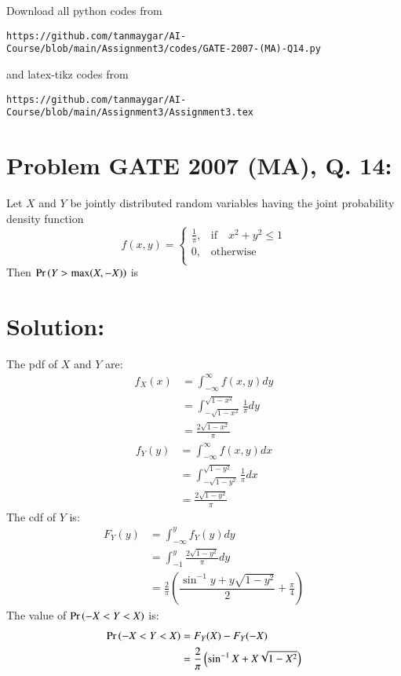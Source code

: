 \documentclass[journal,12pt,twocolumn]{IEEEtran}
\begin{document}
Download all python codes from 
\begin{lstlisting}
https://github.com/tanmaygar/AI-Course/blob/main/Assignment3/codes/GATE-2007-(MA)-Q14.py
\end{lstlisting}
%
and latex-tikz codes from 
%
\begin{lstlisting}
https://github.com/tanmaygar/AI-Course/blob/main/Assignment3/Assignment3.tex
\end{lstlisting}
\section*{Problem GATE 2007 (MA), Q. 14: }
Let $X$ and $Y$ be jointly distributed random
variables having the joint probability
density function
\[
f(x,y) = \begin{cases}
            \frac{1}{\pi}, &\text{if}\quad x^2 + y^2 \leq 1\\
             0, &\text{otherwise}\\
            \end{cases}
\]
Then $\Pr\left(Y > \text{max}(X,-X)\right)$ is

\section*{Solution:}
The pdf of $X$ and $Y$ are:
\begin{align}
    f_X(x)&=\int_{-\infty}^{\infty}f(x,y)dy\\
    &=\int_{-\sqrt{1-x^2}}^{\sqrt{1-x^2}}\frac{1}{\pi}dy\\
    &=\frac{2\sqrt{1-x^2}}{\pi}
\end{align}
\begin{align}
    f_Y(y)&=\int_{-\infty}^{\infty}f(x,y)dx\\
    &=\int_{-\sqrt{1-y^2}}^{\sqrt{1-y^2}}\frac{1}{\pi}dx\\
    &=\frac{2\sqrt{1-y^2}}{\pi}
\end{align}
The cdf of $Y$ is:
\begin{align}
    F_Y(y)&=\int_{-\infty}^{y}f_Y(y)dy\\
    &=\int_{-1}^{y}\frac{2\sqrt{1-y^2}}{\pi}dy\\
    &=\frac{2}{\pi}\left(\dfrac{\sin^{-1}{y} + y\sqrt{1-y^2}}{2} + \frac{\pi}{4}\right)
\end{align}
The value of $\Pr\left(-X<Y<X\right)$ is:
\begin{align}
\Pr\left(-X<Y<X\right) &=F_Y(X)-F_Y(-X)\\
 &=\frac{2}{\pi}\left(\sin^{-1}{X} + X\sqrt{1-X^2}\right)
\end{align}
\end{document}
